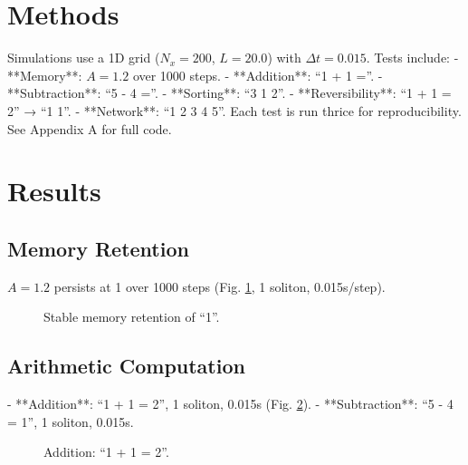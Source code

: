 \documentclass[11pt]{article}
\begin{document}
\section{Methods}
Simulations use a 1D grid (\(N_x = 200\), \(L = 20.0\)) with \(\Delta t = 0.015\). Tests include:
- **Memory**: \(A = 1.2\) over 1000 steps.
- **Addition**: ``1 + 1 =''.
- **Subtraction**: ``5 - 4 =''.
- **Sorting**: ``3 1 2''.
- **Reversibility**: ``1 + 1 = 2'' → ``1 1''.
- **Network**: ``1 2 3 4 5''. Each test is run thrice for reproducibility. See Appendix A for full code.

\section{Results}
\subsection{Memory Retention}
\(A = 1.2\) persists at 1 over 1000 steps (Fig. \ref{fig:memory}, 1 soliton, 0.015s/step).
\begin{figure}[h]
    \centering
    \caption{Stable memory retention of ``1''.}
    \label{fig:memory}
\end{figure}

\subsection{Arithmetic Computation}
- **Addition**: ``1 + 1 = 2'', 1 soliton, 0.015s (Fig. \ref{fig:add}).
- **Subtraction**: ``5 - 4 = 1'', 1 soliton, 0.015s.
\begin{figure}[h]
    \centering
    \caption{Addition: ``1 + 1 = 2''.}
    \label{fig:add}
\end{figure}
\end{document}
